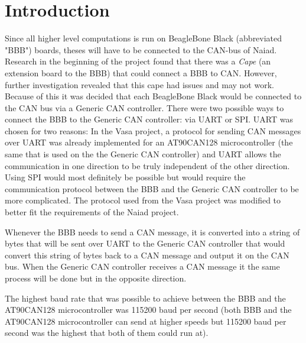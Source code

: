 
\section{Introduction}\label{sec:introduction}
Since all higher level computations is run on BeagleBone Black (abbreviated "BBB") boards, theses will have to be connected to the CAN-bus of Naiad. Research in the beginning of the project found that there was a \emph{Cape} (an extension board to the BBB) that could connect a BBB to CAN. However, further investigation revealed that this cape had issues and may not work. Because of this it was decided that each BeagleBone Black would be connected to the CAN bus via a Generic CAN controller. \newline
There were two possible ways to connect the BBB to the Generic CAN controller: via UART or SPI. UART was chosen for two reasons: In the Vasa project, a protocol for sending CAN messages over UART was already implemented for an AT90CAN128 microcontroller (the same that is used on the the Generic CAN controller) and UART allows the communication in one direction to be truly independent of the other direction. Using SPI would most definitely be possible but would require the communication protocol between the BBB and the Generic CAN controller to be more complicated.  \newline
The protocol used from the Vasa project was modified to better fit the requirements of the Naiad project.

Whenever the BBB needs to send a CAN message, it is converted into a string of bytes that will be sent over UART to the Generic CAN controller that would convert this string of bytes back to a CAN message and output it on the CAN bus. When the Generic CAN controller receives a CAN message it the same process will be done but in the opposite direction.

The highest baud rate that was possible to achieve between the BBB and the AT90CAN128 microcontroller was 115200 baud per second (both BBB and the AT90CAN128 microcontroller can send at higher speeds but 115200 baud per second was the highest that both of them could run at). 